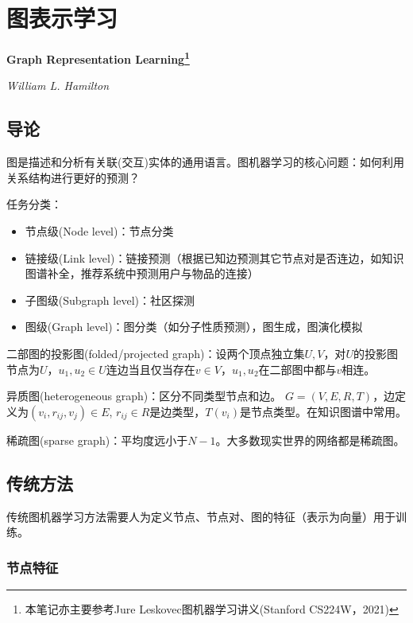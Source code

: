 
\chapter{图表示学习}
\Large\textbf{Graph Representation Learning\footnote{本笔记亦主要参考Jure Leskovec图机器学习讲义(Stanford CS224W，2021)}}
\par \emph{William L. Hamilton} \normalsize

\section{导论}

\par 图是描述和分析有关联(交互)实体的通用语言。图机器学习的核心问题：如何利用关系结构进行更好的预测？

\par 任务分类：
\begin{itemize}
    \item 节点级(Node level)：节点分类
    \item 链接级(Link level)：链接预测（根据已知边预测其它节点对是否连边，如知识图谱补全，推荐系统中预测用户与物品的连接）
    \item 子图级(Subgraph level)：社区探测
    \item 图级(Graph level)：图分类（如分子性质预测），图生成，图演化模拟
\end{itemize}

\par 二部图的投影图(folded/projected graph)：设两个顶点独立集$U,V$，对$U$的投影图节点为$U$，$u_1,u_2\in U$连边当且仅当存在$v\in V$，$u_1,u_2$在二部图中都与$v$相连。

\par 异质图(heterogeneous graph)：区分不同类型节点和边。 $G=(V,E,R,T)$，边定义为$(v_i,r_{ij},v_j)\in E$, $r_{ij}\in R$是边类型，$T(v_i)$是节点类型。在知识图谱中常用。

\par 稀疏图(sparse graph)：平均度远小于$N-1$。大多数现实世界的网络都是稀疏图。

\section{传统方法}

\par 传统图机器学习方法需要人为定义节点、节点对、图的特征（表示为向量）用于训练。

\subsection{节点特征}

